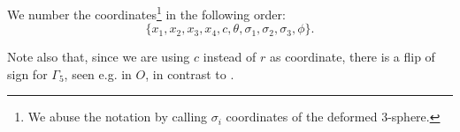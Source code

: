 We number the coordinates\footnote{We abuse the notation by calling $\sigma_i$ coordinates of the deformed 3-sphere.} in the following order:
\begin{equation}
 \{x_1, x_2, x_3, x_4, c, \theta, \sigma_1, \sigma_2, \sigma_3, \phi\}. 
\end{equation}

Note also that, since we are using $c$ instead of $r$ as coordinate, there is a flip of sign for $\Gamma_5$, seen e.g. in $O$, in contrast to \cite{Pilch:2003jg}.

